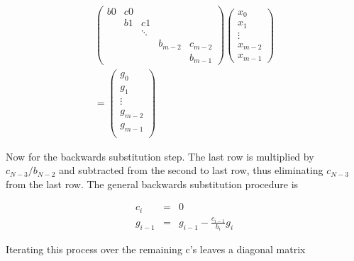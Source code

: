 \documentclass[twocolumn, groupedaddress]{revtex4-1}
\begin{document}
\begin{align}
\label{eqn: mat system}
\left( \begin{array}{ccccc}
    b0 & c0 &        &         &         \\
	   & b1 &  c1    &         &         \\
	   &    & \ddots &         &         \\
	   &	    &        & b_{m-2} & c_{m-2} \\
	   &    &        &         & b_{m-1}
   \end{array} \right)
\left( \begin{array}{c}
	x_0     \\
	x_1     \\
	\vdots  \\
	x_{m-2} \\
	x_{m-1}
   \end{array} \right) \nonumber
 \\ =
\left( \begin{array}{c}
	g_0     \\
	g_1     \\
	\vdots  \\
	g_{m-2} \\
	g_{m-1} \\
   \end{array} \right)
\end{align}

Now for the backwards substitution step.  The last row is multiplied by $c_{N-3}/b_{N-2}$ and subtracted from the second to last row, thus eliminating $c_{N-3}$ from the last row.  The general backwards substitution procedure is 

\begin{equation}
\begin{aligned}
	c_i &=& 0                                    \\
	g_{i-1} &=& g_{i-1} - \frac{c_{i-1}}{b_i}g_i
\end{aligned}
\end{equation}

Iterating this process over the remaining c’s leaves a diagonal matrix
\end{document}
